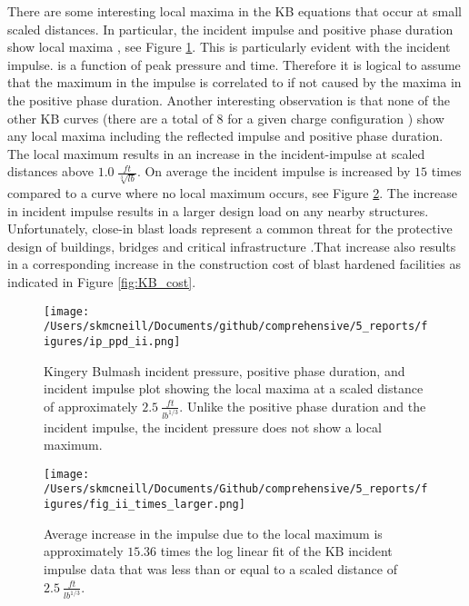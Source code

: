 There are some interesting local maxima in the KB equations that occur at small scaled distances.  In particular, the incident impulse and positive phase duration show local maxima , see Figure \ref{fig:KB_ip_ppd_ii}.  This is particularly evident with the incident impulse. is a function of peak pressure and time.  Therefore it is logical to assume that the maximum in the impulse is correlated to if not caused by the maxima in the positive phase duration.  Another interesting observation is that none of the other KB curves (there are a total of 8 for a given charge configuration ) show any local maxima including the reflected impulse and positive phase duration.  The local maximum results in an increase in the incident-impulse at scaled distances above $1.0\:\frac{ft}{\sqrt[3]{lb}}$.  On average the incident impulse is increased by $15$ times compared to a curve where no local maximum occurs, see Figure \ref{fig:KB_avg_inc}.  The increase in incident impulse results in a larger design load on any nearby structures. Unfortunately, close-in blast loads represent a common threat for the protective design of buildings, bridges and critical infrastructure \cite{Shin2015a}\cite{Shin2014}.That increase also results in a corresponding increase in the construction cost of blast hardened facilities as indicated in Figure \ref{fig:KB_cost}.  
\begin{figure}[tb]
  \begin{center}
   \texttt{[image: /Users/skmcneill/Documents/github/comprehensive/5\_reports/figures/ip\_ppd\_ii.png]}
  \end{center}
  \caption{Kingery Bulmash incident pressure, positive phase duration, and incident impulse plot showing the local maxima at a scaled distance of approximately $2.5\:\frac{ft}{lb^{1/3}}$\citep{Kingery1984}.  Unlike the positive phase duration and the incident impulse, the incident pressure does not show a local maximum.}
\label{fig:KB_ip_ppd_ii}
\end{figure}%

\begin{figure}[tb]
  \begin{center}
   \texttt{[image: /Users/skmcneill/Documents/Github/comprehensive/5\_reports/figures/fig\_ii\_times\_larger.png]}
  \end{center}
  \caption{Average increase in the impulse due to the local maximum is approximately $15.36$ times the log linear fit of the KB incident impulse data that was less than or equal to a scaled distance of $2.5\:\frac{ft}{lb^{1/3}}$.}
\label{fig:KB_avg_inc}
\end{figure}%

